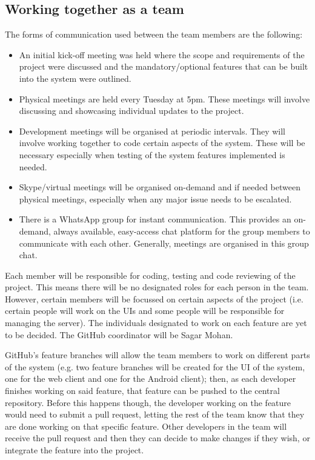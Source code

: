 \documentclass[11pt,a4paper]{article}
\begin{document}
\subsection{Working together as a team}
The forms of communication used between the team members are the following:
\begin{itemize}
\item An initial kick-off meeting was held where the scope and requirements of the project were discussed and the mandatory/optional features that can be built into the system were outlined.
\item Physical meetings are held every Tuesday at 5pm. These meetings will involve discussing and showcasing individual updates to the project. 
\item Development meetings will be organised at periodic intervals. They will involve working together to code certain aspects of the system. These will be necessary especially when testing of the system features implemented is needed.
\item Skype/virtual meetings will be organised on-demand and if needed between physical meetings, especially when any major issue needs to be escalated. 
\item There is a WhatsApp group for instant communication. This provides an on-demand, always available, easy-access chat platform for the group members to communicate with each other. Generally, meetings are organised in this group chat.
\end{itemize}
Each member will be responsible for coding, testing and code reviewing of the project. This means there will be no designated roles for each person in the team. However, certain members will be focussed on certain aspects of the project (i.e. certain people will work on the UIs and some people will be responsible for managing the server). The individuals designated to work on each feature are yet to be decided. The GitHub coordinator will be Sagar Mohan.

GitHub's feature branches will allow the team members to work on different parts of the system (e.g. two feature branches will be created for the UI of the system, one for the web client and one for the Android client); then, as each developer finishes working on said feature, that feature can be pushed to the central repository. Before this happens though, the developer working on the feature would need to submit a pull request, letting the rest of the team know that they are done working on that specific feature. Other developers in the team will receive the pull request and then they can decide to make changes if they wish, or integrate the feature into the project.
\end{document}
